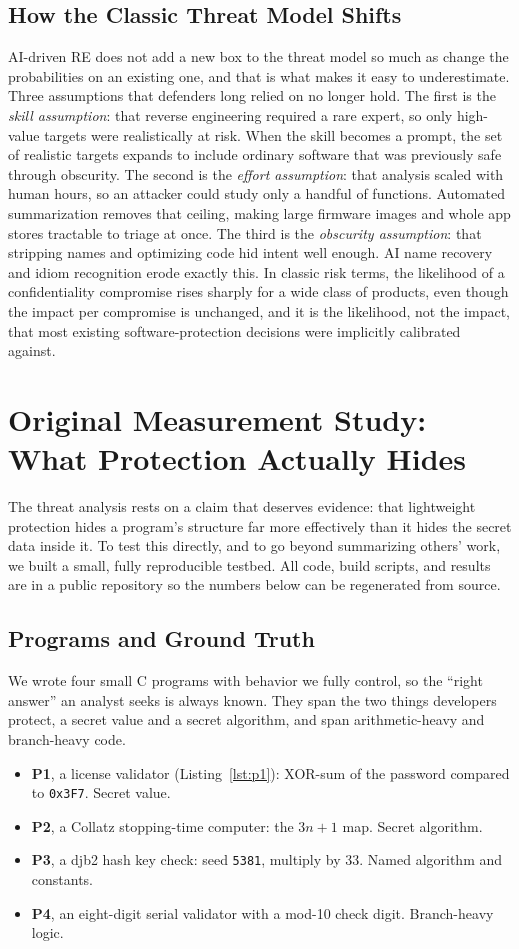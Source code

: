 \documentclass[conference]{IEEEtran}
\begin{document}
\subsection{How the Classic Threat Model Shifts}
AI-driven RE does not add a new box to the threat model so much as change the
probabilities on an existing one, and that is what makes it easy to underestimate.
Three assumptions that defenders long relied on no longer hold. The first is the
\emph{skill assumption}: that reverse engineering required a rare expert, so only
high-value targets were realistically at risk. When the skill becomes a prompt, the
set of realistic targets expands to include ordinary software that was previously
safe through obscurity. The second is the \emph{effort assumption}: that analysis
scaled with human hours, so an attacker could study only a handful of functions.
Automated summarization removes that ceiling, making large firmware images and whole
app stores tractable to triage at once. The third is the \emph{obscurity
assumption}: that stripping names and optimizing code hid intent well enough. AI
name recovery and idiom recognition erode exactly this. In classic risk terms, the
likelihood of a confidentiality compromise rises sharply for a wide class of
products, even though the impact per compromise is unchanged, and it is the
likelihood, not the impact, that most existing software-protection decisions were
implicitly calibrated against.

\section{Original Measurement Study: What Protection Actually Hides}\label{sec:study}
The threat analysis rests on a claim that deserves evidence: that lightweight
protection hides a program's structure far more effectively than it hides the secret
data inside it. To test this directly, and to go beyond summarizing others' work, we
built a small, fully reproducible testbed. All code, build scripts, and results are
in a public repository so the numbers below can be regenerated from source.

\subsection{Programs and Ground Truth}
We wrote four small C programs with behavior we fully control, so the ``right
answer'' an analyst seeks is always known. They span the two things developers
protect, a secret value and a secret algorithm, and span arithmetic-heavy and
branch-heavy code.
\begin{itemize}
\item \textbf{P1}, a license validator (Listing~\ref{lst:p1}): XOR-sum of the
password compared to \texttt{0x3F7}. Secret value.
\item \textbf{P2}, a Collatz stopping-time computer: the $3n{+}1$ map. Secret
algorithm.
\item \textbf{P3}, a djb2 hash key check: seed \texttt{5381}, multiply by $33$.
Named algorithm and constants.
\item \textbf{P4}, an eight-digit serial validator with a mod-10 check digit.
Branch-heavy logic.
\end{itemize}
\end{document}
